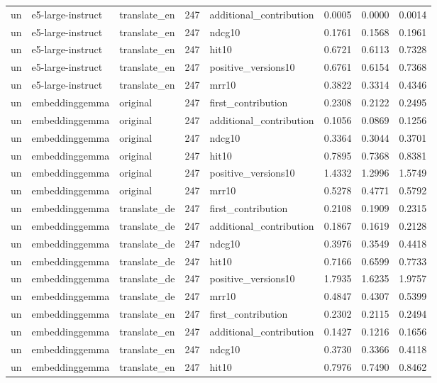 \begin{tabular}{lllrlrrr}
un & e5-large-instruct & translate\_en & 247 & additional\_contribution & 0.0005 & 0.0000 & 0.0014 \\
un & e5-large-instruct & translate\_en & 247 & ndcg10 & 0.1761 & 0.1568 & 0.1961 \\
un & e5-large-instruct & translate\_en & 247 & hit10 & 0.6721 & 0.6113 & 0.7328 \\
un & e5-large-instruct & translate\_en & 247 & positive\_versions10 & 0.6761 & 0.6154 & 0.7368 \\
un & e5-large-instruct & translate\_en & 247 & mrr10 & 0.3822 & 0.3314 & 0.4346 \\
un & embeddinggemma & original & 247 & first\_contribution & 0.2308 & 0.2122 & 0.2495 \\
un & embeddinggemma & original & 247 & additional\_contribution & 0.1056 & 0.0869 & 0.1256 \\
un & embeddinggemma & original & 247 & ndcg10 & 0.3364 & 0.3044 & 0.3701 \\
un & embeddinggemma & original & 247 & hit10 & 0.7895 & 0.7368 & 0.8381 \\
un & embeddinggemma & original & 247 & positive\_versions10 & 1.4332 & 1.2996 & 1.5749 \\
un & embeddinggemma & original & 247 & mrr10 & 0.5278 & 0.4771 & 0.5792 \\
un & embeddinggemma & translate\_de & 247 & first\_contribution & 0.2108 & 0.1909 & 0.2315 \\
un & embeddinggemma & translate\_de & 247 & additional\_contribution & 0.1867 & 0.1619 & 0.2128 \\
un & embeddinggemma & translate\_de & 247 & ndcg10 & 0.3976 & 0.3549 & 0.4418 \\
un & embeddinggemma & translate\_de & 247 & hit10 & 0.7166 & 0.6599 & 0.7733 \\
un & embeddinggemma & translate\_de & 247 & positive\_versions10 & 1.7935 & 1.6235 & 1.9757 \\
un & embeddinggemma & translate\_de & 247 & mrr10 & 0.4847 & 0.4307 & 0.5399 \\
un & embeddinggemma & translate\_en & 247 & first\_contribution & 0.2302 & 0.2115 & 0.2494 \\
un & embeddinggemma & translate\_en & 247 & additional\_contribution & 0.1427 & 0.1216 & 0.1656 \\
un & embeddinggemma & translate\_en & 247 & ndcg10 & 0.3730 & 0.3366 & 0.4118 \\
un & embeddinggemma & translate\_en & 247 & hit10 & 0.7976 & 0.7490 & 0.8462 \\

\end{tabular}
